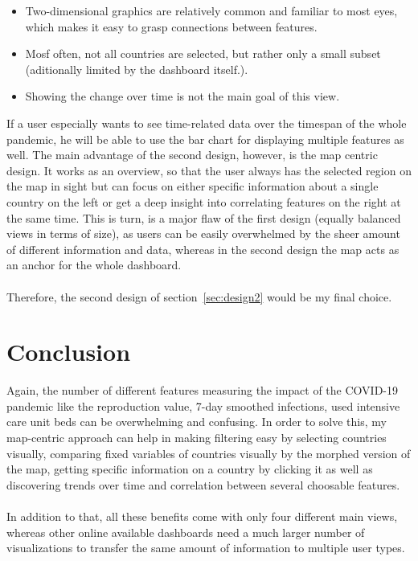 \documentclass[11pt]{article}
\begin{document}
\begin{itemize}
  \item Two-dimensional graphics are relatively common and familiar to most eyes, which makes it easy to grasp connections between features.
  \item Mosf often, not all countries are selected, but rather only a small subset (aditionally limited by the dashboard itself.).
  \item Showing the change over time is not the main goal of this view.
\end{itemize}

If a user especially wants to see time-related data over the timespan of the whole pandemic, he will be able to use the bar chart for displaying multiple 
features as well.
The main advantage of the second design, however, is the map centric design. It works as an overview, so that the user always has the selected 
region on the map in sight but can focus on either specific information about a single country on the left or get a deep insight into correlating features 
on the right at the same time.
This is turn, is a major flaw of the first design (equally balanced views in terms of size), as users can be easily overwhelmed by the sheer amount of 
different information and data, whereas in the second design the map acts as an anchor for the whole dashboard. 
\\\\
Therefore, the second design of section~\ref{sec:design2} would be my final choice.


\section{Conclusion}
Again, the number of different features measuring the impact of the COVID-19 pandemic like the reproduction value, 7-day smoothed infections, used intensive 
care unit beds can be overwhelming and confusing. In order to solve this, my map-centric approach can help in making filtering easy by selecting countries visually, 
comparing fixed variables of countries visually by the morphed version of the map, getting specific information on a country by clicking it as well as 
discovering trends over time and correlation between several choosable features.
\\\\
In addition to that, all these benefits come with only four different main views, whereas other online available dashboards need a much larger number 
of visualizations to transfer the same amount of information to multiple user types.
\end{document}
